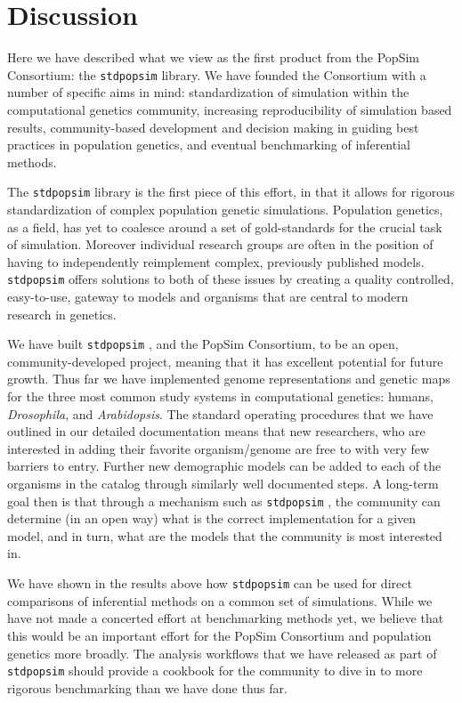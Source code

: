 \documentclass[12pt,halfline,a4paper]{ouparticle}
\newcommand{\stdpopsim}{\texttt{stdpopsim} }
\begin{document}
\section*{Discussion}
Here we have described what we view as the first product from the PopSim Consortium:
the \stdpopsim library. We have founded the Consortium with a number of specific aims
in mind: standardization of simulation within the computational genetics community,
increasing reproducibility of simulation based results, community-based development and
decision making in guiding best practices in population genetics, and eventual benchmarking
of inferential methods.

The \stdpopsim library is the first piece of this effort, in that it allows for rigorous
standardization of complex population genetic simulations. Population genetics, as a field,
has yet to coalesce around a set of gold-standards for the crucial task of simulation.
Moreover individual research groups are often in the position of having to independently
reimplement complex, previously published models. \stdpopsim offers solutions to both of
these issues by creating a quality controlled, easy-to-use, gateway to models and organisms
that are central to modern research in genetics.

We have built \stdpopsim, and the PopSim Consortium, to be an open, community-developed
project, meaning that it has excellent potential for future growth.
Thus far we have implemented genome representations and genetic maps for the three most
common study systems in computational genetics: humans, \emph{Drosophila}, and \emph{Arabidopsis}.
The standard operating procedures that we have outlined in our detailed documentation
means that new researchers, who are interested in adding their favorite organism/genome
are free to with very few barriers to entry. Further new demographic models can be added
to each of the organisms in the catalog through similarly well documented steps.
A long-term goal then is that through a mechanism such as \stdpopsim, the community
can determine (in an open way) what is the correct implementation for a given model,
and in turn, what are the models that the community is most interested in.

We have shown in the results above how \stdpopsim can be used for direct comparisons
of inferential methods on a common set of simulations. While we have not made a concerted
effort at benchmarking methods yet, we believe that this would be an important effort for
the PopSim Consortium and population genetics more broadly. The analysis workflows that
we have released as part of \stdpopsim should provide a cookbook for the community to
dive in to more rigorous benchmarking than we have done thus far.
\end{document}
